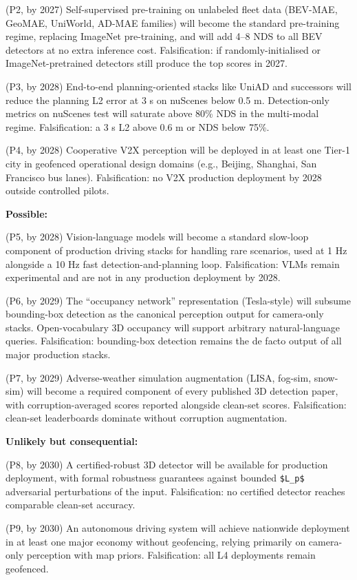 \documentclass{article}
\begin{document}
(P2, by 2027) Self-supervised pre-training on unlabeled fleet data (BEV-MAE, GeoMAE, UniWorld, AD-MAE families) will become the standard pre-training regime, replacing ImageNet pre-training, and will add 4--8 NDS to all BEV detectors at no extra inference cost. Falsification: if randomly-initialised or ImageNet-pretrained detectors still produce the top scores in 2027.

(P3, by 2028) End-to-end planning-oriented stacks like UniAD and successors will reduce the planning L2 error at 3 s on nuScenes below 0.5 m. Detection-only metrics on nuScenes test will saturate above 80\% NDS in the multi-modal regime. Falsification: a 3 s L2 above 0.6 m or NDS below 75\%.

(P4, by 2028) Cooperative V2X perception will be deployed in at least one Tier-1 city in geofenced operational design domains (e.g., Beijing, Shanghai, San Francisco bus lanes). Falsification: no V2X production deployment by 2028 outside controlled pilots.

\textbf{Possible:}

(P5, by 2028) Vision-language models will become a standard slow-loop component of production driving stacks for handling rare scenarios, used at 1 Hz alongside a 10 Hz fast detection-and-planning loop. Falsification: VLMs remain experimental and are not in any production deployment by 2028.

(P6, by 2029) The ``occupancy network'' representation (Tesla-style) will subsume bounding-box detection as the canonical perception output for camera-only stacks. Open-vocabulary 3D occupancy will support arbitrary natural-language queries. Falsification: bounding-box detection remains the de facto output of all major production stacks.

(P7, by 2029) Adverse-weather simulation augmentation (LISA, fog-sim, snow-sim) will become a required component of every published 3D detection paper, with corruption-averaged scores reported alongside clean-set scores. Falsification: clean-set leaderboards dominate without corruption augmentation.

\textbf{Unlikely but consequential:}

(P8, by 2030) A certified-robust 3D detector will be available for production deployment, with formal robustness guarantees against bounded \texttt{\$L\_p\$} adversarial perturbations of the input. Falsification: no certified detector reaches comparable clean-set accuracy.

(P9, by 2030) An autonomous driving system will achieve nationwide deployment in at least one major economy without geofencing, relying primarily on camera-only perception with map priors. Falsification: all L4 deployments remain geofenced.
\end{document}
